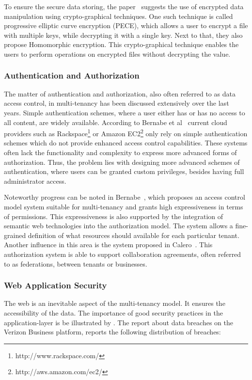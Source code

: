 To ensure the secure data storing, the paper~\cite{Takahashi2012Security} suggests the use of encrypted data manipulation using crypto-graphical techniques. 
One such technique is called progressive elliptic curve encryption (PECE), which allows a user to encrypt a file with multiple keys, while decrypting it with a single key. 
Next to that, they also propose Homomorphic encryption. 
This crypto-graphical technique enables the users to perform operations on encrypted files without decrypting the value.

\subsubsection{Authentication and Authorization}
The matter of authentication and authorization, also often referred to as data access control, in multi-tenancy has been discussed extensively over the last years. 
Simple authentication schemes, where a user either has or has no access to all content, are widely available. According to Bernabe et al~\cite{Bernabe2012Auth} current cloud providers such as Rackspace\footnote{http://www.rackspace.com/} or Amazon EC2\footnote{http://aws.amazon.com/ec2/} only rely on simple authentication schemes which do not provide enhanced access control capabilities. 
These systems often lack the functionality and complexity to express more advanced forms of authorization. 
Thus, the problem lies with designing more advanced schemes of authentication, where users can be granted custom privileges, besides having full administrator access.

Noteworthy progress can be noted in Bernabe~\cite{Bernabe2012Auth}, which proposes an access control model system suitable for multi-tenancy and grants high expressiveness in terms of permissions. 
This expressiveness is also supported by the integration of semantic web technologies into the authorization model. 
The system allows a fine-grained definition of what resources should available for each particular tenant. 
Another influence in this area is the system proposed in Calero~\cite{Calero2010Auth}. 
This authorization system is able to support collaboration agreements, often referred to as federations, between tenants or businesses.

\subsubsection{Web Application Security}
The web is an inevitable aspect of the multi-tenancy model. 
It ensures the accessibility of the data. 
The importance of good security practices in the application-layer is be illustrated by . 
The report about data breaches on the Verizon Business platform, reports the following distribution of breaches:


